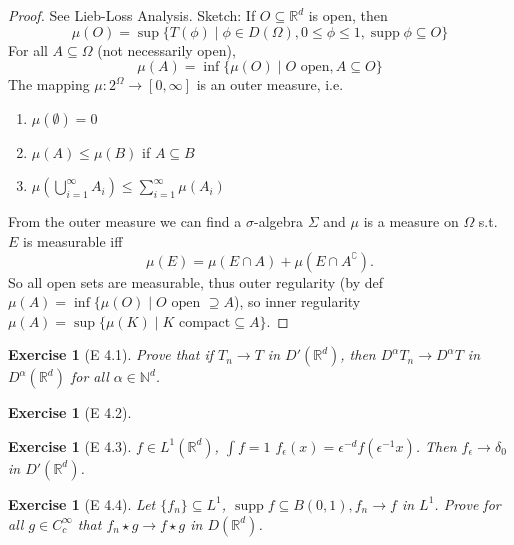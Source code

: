 \documentclass{report}
\theoremstyle{tommy}
\newtheorem{ex}[defn]{Exercise}
\newcommand{\supp}{\operatorname{supp}}
\begin{document}
  \begin{proof}See Lieb-Loss Analysis. Sketch: If \(O \subseteq \mathbb{R}^d\) is open, then 
    \[\mu(O) = \sup \{T(\phi) \mid \phi \in D(\Omega), 0 \le \phi \le 1, \supp \phi \subseteq O\}\]
    For all \(A \subseteq \Omega\) (not necessarily open),
    \[\mu(A) = \inf \{\mu(O) \mid O \text{ open}, A \subseteq O\}\]
    The mapping \(\mu: 2^\Omega \to [0, \infty]\) is an outer measure, i.e.
    \begin{enumerate}
      \item \(\mu(\emptyset) = 0\)
      \item \(\mu(A) \le \mu(B)\) if \(A \subseteq B\)
      \item \(\mu \left(\bigcup_{i=1}^\infty A_i\right) \le \sum_{i=1}^\infty \mu(A_i)\)
    \end{enumerate}
    From the outer measure we can find a \(\sigma\)-algebra \(\Sigma\) and \(\mu\) is a measure on \(\Omega\) s.t. \(E\) is measurable iff \[\mu(E) = \mu(E \cap A) + \mu(E \cap A^\complement).\]
    So all open sets are measurable, thus outer regularity (by def \(\mu(A) = \inf\{\mu(O) \mid O \text{ open } \supseteq A\)), so inner regularity \(\mu(A) = \sup\{\mu(K) \mid K \text{ compact} \subseteq A\}\). 
  \end{proof}

  \begin{ex}[E 4.1]
    Prove that if \(T_n \to T\) in \(D'(\mathbb{R}^d)\), then \(D^\alpha T_n  \to D^\alpha T\) in \(D^\alpha(\mathbb{R}^d)\) for all \(\alpha \in \mathbb{N}^d\).
  \end{ex}

  \begin{ex}[E 4.2]
  \end{ex}

  \begin{ex}[E 4.3]
    \(f \in L^1(\mathbb{R}^d)\), \(\int f = 1\) \(f_\epsilon(x) = \epsilon^{-d} f(\epsilon^{-1}x)\). Then \(f_\epsilon \to \delta_0\) in \(D'(\mathbb{R}^d)\). 
  \end{ex}

  \begin{ex}[E 4.4]
    Let \(\{f_n\} \subseteq L^1\), \(\supp f \subseteq B(0,1), f_n \to f\) in \(L^1\). Prove for all \(g \in C_c^\infty\) that \(f_n \star g \to f \star g\) in \(D(\mathbb{R}^d)\).
  \end{ex}
\end{document}
